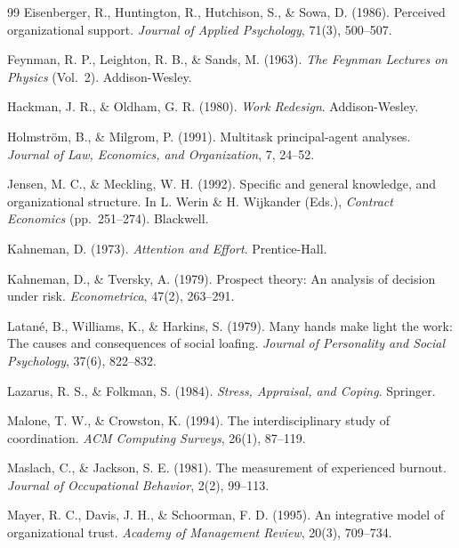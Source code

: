 \documentclass[12pt]{article}
\begin{document}
\begin{thebibliography}{99}
Eisenberger, R., Huntington, R., Hutchison, S., \& Sowa, D. (1986).
Perceived organizational support.
\textit{Journal of Applied Psychology}, 71(3), 500--507.

Feynman, R. P., Leighton, R. B., \& Sands, M. (1963).
\textit{The Feynman Lectures on Physics} (Vol.\ 2).
Addison-Wesley.

Hackman, J. R., \& Oldham, G. R. (1980).
\textit{Work Redesign}.
Addison-Wesley.

Holmstr\"om, B., \& Milgrom, P. (1991).
Multitask principal-agent analyses.
\textit{Journal of Law, Economics, and Organization}, 7, 24--52.

Jensen, M. C., \& Meckling, W. H. (1992).
Specific and general knowledge, and organizational structure.
In L. Werin \& H. Wijkander (Eds.),
\textit{Contract Economics} (pp.\ 251--274).
Blackwell.

Kahneman, D. (1973).
\textit{Attention and Effort}.
Prentice-Hall.

Kahneman, D., \& Tversky, A. (1979).
Prospect theory: An analysis of decision under risk.
\textit{Econometrica}, 47(2), 263--291.

Latan\'e, B., Williams, K., \& Harkins, S. (1979).
Many hands make light the work: The causes and consequences of social loafing.
\textit{Journal of Personality and Social Psychology}, 37(6), 822--832.

Lazarus, R. S., \& Folkman, S. (1984).
\textit{Stress, Appraisal, and Coping}.
Springer.

Malone, T. W., \& Crowston, K. (1994).
The interdisciplinary study of coordination.
\textit{ACM Computing Surveys}, 26(1), 87--119.

Maslach, C., \& Jackson, S. E. (1981).
The measurement of experienced burnout.
\textit{Journal of Occupational Behavior}, 2(2), 99--113.

Mayer, R. C., Davis, J. H., \& Schoorman, F. D. (1995).
An integrative model of organizational trust.
\textit{Academy of Management Review}, 20(3), 709--734.


\end{thebibliography}
\end{document}
